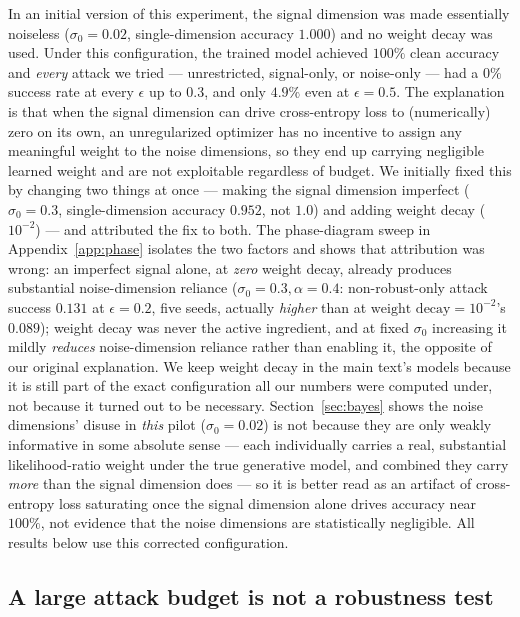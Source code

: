 \documentclass[11pt]{article}
\begin{document}
In an initial version of this experiment, the signal dimension was made
essentially noiseless ($\sigma_0 = 0.02$, single-dimension accuracy
$1.000$) and no weight decay was used. Under this configuration, the
trained model achieved $100\%$ clean accuracy and \emph{every} attack we
tried --- unrestricted, signal-only, or noise-only --- had a $0\%$ success
rate at every $\epsilon$ up to $0.3$, and only $4.9\%$ even at
$\epsilon=0.5$. The explanation is that when the signal dimension can drive
cross-entropy loss to (numerically) zero on its own, an unregularized
optimizer has no incentive to assign any meaningful weight to the noise
dimensions, so they end up carrying negligible learned weight and are not
exploitable regardless of budget. We initially fixed this by changing two
things at once --- making the signal dimension imperfect ($\sigma_0 =
0.3$, single-dimension accuracy $0.952$, not $1.0$) and adding weight
decay ($10^{-2}$) --- and attributed the fix to both. The phase-diagram
sweep in Appendix~\ref{app:phase} isolates the two factors and shows that
attribution was wrong: an imperfect signal alone, at \emph{zero} weight
decay, already produces substantial noise-dimension reliance
($\sigma_0=0.3, \alpha=0.4$: non-robust-only attack success $0.131$ at
$\epsilon=0.2$, five seeds, actually \emph{higher} than at
$\text{weight decay}=10^{-2}$'s $0.089$); weight decay was never the
active ingredient, and at fixed $\sigma_0$ increasing it mildly
\emph{reduces} noise-dimension reliance rather than enabling it, the
opposite of our original explanation. We keep weight decay in the main
text's models because it is still part of the exact configuration all our
numbers were computed under, not because it turned out to be necessary.
Section~\ref{sec:bayes} shows the noise dimensions' disuse in \emph{this}
pilot ($\sigma_0=0.02$) is not because they are only weakly informative in
some absolute sense --- each individually carries a real, substantial
likelihood-ratio weight under the true generative model, and combined they
carry \emph{more} than the signal dimension does --- so it is better read
as an artifact of cross-entropy loss saturating once the signal dimension
alone drives accuracy near $100\%$, not evidence that the noise dimensions
are statistically negligible. All results below use this corrected
configuration.

\subsection{A large attack budget is not a robustness test}
\label{sec:pitfall}
\end{document}
